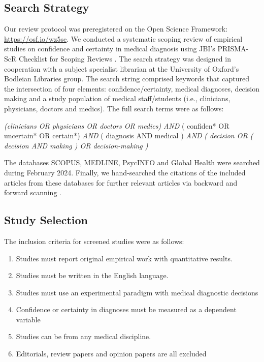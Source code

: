 \documentclass[a4paper, nobind]{templates/ociamthesis}
\providecommand{\tightlist}{%
  \setlength{\itemsep}{0pt}\setlength{\parskip}{0pt}}
\begin{document}
\subsection{Search Strategy}\label{search-strategy}

Our review protocol was preregistered on the Open Science Framework: \url{https://osf.io/wz5se}. We conducted a systematic scoping review of empirical studies on confidence and certainty in medical diagnosis using JBI's PRISMA-ScR Checklist for Scoping Reviews \autocite{peters_scoping_2024}. The search strategy was designed in cooperation with a subject specialist librarian at the University of Oxford's Bodleian Libraries group. The search string comprised keywords that captured the intersection of four elements: confidence/certainty, medical diagnoses, decision making and a study population of medical staff/students (i.e., clinicians, physicians, doctors and medics). The full search terms were as follows:

\hfill\break
\emph{(clinicians OR physicians OR doctors OR medics)} \emph{AND} ( confiden* OR uncertain* OR certain*) \emph{AND} ( diagnosis AND medical ) \emph{AND} \emph{( decision OR ( decision AND making ) OR decision-making )}

\hfill\break
The databases SCOPUS, MEDLINE, PsycINFO and Global Health were searched during February 2024. Finally, we hand-searched the citations of the included articles from these databases for further relevant articles via backward and forward scanning \autocite{webster_analyzing_2002,tranfield_towards_2003}.

\subsection{Study Selection}\label{study-selection}

The inclusion criteria for screened studies were as follows:

\begin{enumerate}
\def\labelenumi{\arabic{enumi}.}
\tightlist
\item
  Studies must report original empirical work with quantitative results.
\item
  Studies must be written in the English language.
\item
  Studies must use an experimental paradigm with medical diagnostic decisions
\item
  Confidence or certainty in diagnoses must be measured as a dependent variable
\item
  Studies can be from any medical discipline.
\item
  Editorials, review papers and opinion papers are all excluded
\end{enumerate}
\end{document}

